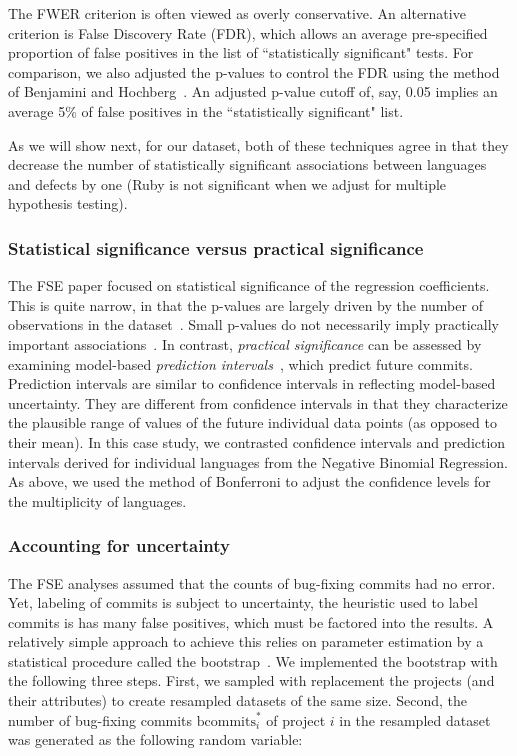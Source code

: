 \documentclass[acmsmall]{acmart}
\newcommand{\ruby}{{\sf  Ruby}\xspace}
\begin{document}
The FWER criterion is often viewed as overly conservative. An alternative
criterion is False Discovery Rate (FDR), which allows an average
pre-specified proportion of false positives in the list of ``statistically
significant" tests. For comparison, we also adjusted the p-values to control
the FDR using the method of Benjamini and Hochberg~\cite{fdr}.  An adjusted
p-value cutoff of, say, 0.05 implies an average 5\% of false positives in
the ``statistically significant" list.

As we will show next, for our dataset, both of these techniques agree in
that they decrease the number of statistically significant associations
between languages and defects by one (\ruby is not significant when we
adjust for multiple hypothesis testing).



\subsubsection{Statistical significance versus practical significance}

The FSE paper focused on statistical significance of the regression
coefficients.  This is quite narrow, in that the p-values are largely driven
by the number of observations in the dataset~\cite{halsey}. Small p-values
do not necessarily imply practically important
associations~\cite{lazar,misinterp}. In contrast, \emph{practical
  significance} can be assessed by examining model-based {\it prediction
  intervals}~\cite{knnl}, which predict future commits. Prediction intervals
are similar to confidence intervals in reflecting model-based
uncertainty. They are different from confidence intervals in that they
characterize the plausible range of values of the future individual data
points (as opposed to their mean). In this case study, we contrasted
confidence intervals and prediction intervals derived for individual
languages from the Negative Binomial Regression. As above, we used the
method of Bonferroni to adjust the confidence levels for the multiplicity of
languages.


\subsubsection{Accounting for uncertainty}

The FSE analyses assumed that the counts of bug-fixing commits had no
error. Yet, labeling of commits is subject to uncertainty, the heuristic
used to label commits is has many false positives, which must be factored
into the results. A relatively simple approach to achieve this relies on
parameter estimation by a statistical procedure called the
bootstrap~\cite{knnl}. We implemented the bootstrap with the following three
steps. First, we sampled with replacement the projects (and their
attributes) to create resampled datasets of the same size. Second, the
number of bug-fixing commits $\mathrm{bcommits}^*_i$ of project $i$ in the
resampled dataset was generated as the following random variable:
\end{document}
